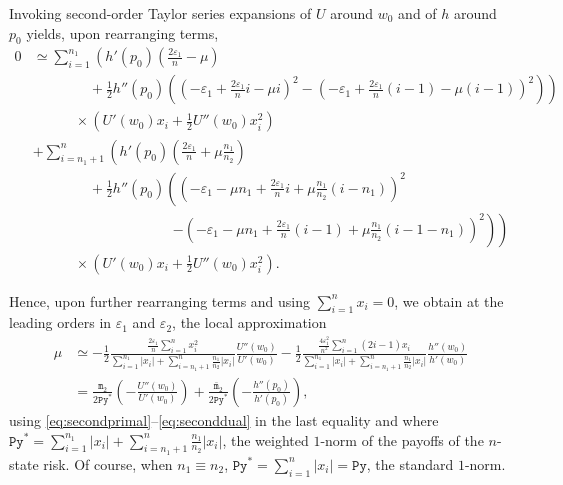 \documentclass[11pt]{article}
\begin{document}
\begin{appendices}
Invoking second-order Taylor series expansions of 
$U$ around $w_{0}$
and of 
$h$ around $p_{0}$
yields, upon rearranging terms,
\begin{align*}
0&\simeq
\sum_{i=1}^{n_{1}}\left(h'\left(p_{0}\right)\left(\frac{2\varepsilon_{1}}{n}-\mu\right)\right.\\
&\left.\qquad\qquad+\frac{1}{2}h''\left(p_{0}\right)
\left(\left(-\varepsilon_{1}+\frac{2\varepsilon_{1}}{n}i-\mu i\right)^{2}
-\left(-\varepsilon_{1}+\frac{2\varepsilon_{1}}{n}(i-1)-\mu(i-1)\right)^{2}\right)\right)\\
&\quad\qquad\times\left(U'\left(w_{0}\right)x_{i}+\frac{1}{2}U''\left(w_{0}\right)x_{i}^{2}\right)\\
&+\sum_{i=n_{1}+1}^{n}\left(h'\left(p_{0}\right)\left(\frac{2\varepsilon_{1}}{n}+\mu\frac{n_{1}}{n_{2}}\right)\right.\\
&\left.\qquad\qquad+\frac{1}{2}h''\left(p_{0}\right)
\left(\left(-\varepsilon_{1}-\mu n_{1}+\frac{2\varepsilon_{1}}{n}i+\mu\frac{n_{1}}{n_{2}}(i-n_{1})\right)^{2}\right.\right.\\
&\qquad\qquad\qquad\qquad\qquad\left.\left.-\left(-\varepsilon_{1}-\mu n_{1}+\frac{2\varepsilon_{1}}{n}(i-1)+\mu\frac{n_{1}}{n_{2}}(i-1-n_{1})\right)^{2}\right)\right)\\
&\quad\qquad\times\left(U'\left(w_{0}\right)x_{i}+\frac{1}{2}U''\left(w_{0}\right)x_{i}^{2}\right).
\end{align*}

Hence, upon further rearranging terms and using $\sum_{i=1}^{n}x_{i}=0$,
we obtain at the leading orders in $\varepsilon_{1}$ and $\varepsilon_{2}$,
the local approximation
\begin{align*}
\mu&\simeq -\frac{1}{2}\frac{\frac{2\varepsilon_{1}}{n}\sum_{i=1}^{n}x_{i}^{2}}{\sum_{i=1}^{n_{1}}|x_{i}|+\sum_{i=n_{1}+1}^{n}\tfrac{n_{1}}{n_{2}}|x_{i}|}\frac{U''(w_{0})}{U'(w_{0})}
-\frac{1}{2}\frac{\frac{4\varepsilon_{1}^{2}}{n^{2}}\sum_{i=1}^{n}(2i-1)x_{i}}{\sum_{i=1}^{n_{1}}|x_{i}|+\sum_{i=n_{1}+1}^{n}\tfrac{n_{1}}{n_{2}}|x_{i}|}\frac{h''(w_{0})}{h'(w_{0})}\\
&=\frac{\texttt{m}_{2}}{2\texttt{Py}^{\ast}}\left(-\frac{U''(w_{0})}{U'(w_{0})}\right)
+\frac{\bar{\texttt{m}}_{2}}{2\texttt{Py}^{\ast}}\left(-\frac{h''(p_{0})}{h'(p_{0})}\right),
\end{align*}
using \eqref{eq:secondprimal}--\eqref{eq:seconddual} in the last equality
and where $\texttt{Py}^{\ast}=\sum_{i=1}^{n_{1}}|x_{i}|+\sum_{i=n_{1}+1}^{n}\tfrac{n_{1}}{n_{2}}|x_{i}|$,
the weighted $1$-norm of the payoffs of the $n$-state risk.
Of course, when $n_{1}\equiv n_{2}$, $\texttt{Py}^{\ast}=\sum_{i=1}^{n}|x_{i}|=\texttt{Py}$,
the standard $1$-norm.


\end{appendices}
\end{document}
